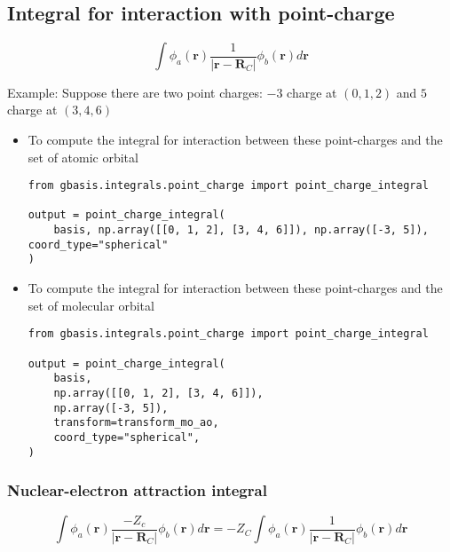 \documentclass[letterpaper]{article}
\begin{document}
\subsection{Integral for interaction with point-charge}
\begin{equation}
  \label{eq:point_charge}
  \int \phi_a(\mathbf{r}) \frac{1}{|\mathbf{r} - \mathbf{R}_C|} \phi_b(\mathbf{r}) d\mathbf{r}
\end{equation}

Example:
Suppose there are two point charges: $-3$ charge at $(0, 1, 2)$ and $5$ charge
at $(3, 4, 6)$
\begin{itemize}
\item To compute the integral for interaction between these point-charges and
  the set of atomic orbital
  \begin{lstlisting}[xleftmargin=-25pt]
from gbasis.integrals.point_charge import point_charge_integral

output = point_charge_integral(
    basis, np.array([[0, 1, 2], [3, 4, 6]]), np.array([-3, 5]), coord_type="spherical"
)
\end{lstlisting}
\item To compute the integral for interaction between these point-charges and
  the set of molecular orbital
  \begin{lstlisting}[xleftmargin=-25pt]
from gbasis.integrals.point_charge import point_charge_integral

output = point_charge_integral(
    basis,
    np.array([[0, 1, 2], [3, 4, 6]]),
    np.array([-3, 5]),
    transform=transform_mo_ao,
    coord_type="spherical",
)
\end{lstlisting}
\end{itemize}
\subsubsection{Nuclear-electron attraction integral}
\begin{equation}
  \label{eq:nuclear_electron_attraction}
  \int \phi_a(\mathbf{r}) \frac{-Z_c}{|\mathbf{r} - \mathbf{R}_C|} \phi_b(\mathbf{r}) d\mathbf{r}
  =
  -Z_C \int \phi_a(\mathbf{r}) \frac{1}{|\mathbf{r} - \mathbf{R}_C|} \phi_b(\mathbf{r}) d\mathbf{r}
\end{equation}
\end{document}
